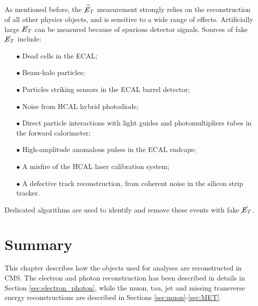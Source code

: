 As mentioned before, the $\vec{\cancel{E}}_T$ measurement \cite{met_cds} strongly relies on the reconstruction of all other physics objects, and is sensitive to a wide range of effects. Artificially large $\cancel{E}_T$ can be measured because of spurious detector signals. Sources of fake $\cancel{E}_T$ include:
\begin{itemize}
\item[$\bullet$] Dead cells in the ECAL;
\item[$\bullet$] Beam-halo particles;
\item[$\bullet$] Particles striking sensors in the ECAL barrel detector;
\item[$\bullet$] Noise from HCAL hybrid photodiode;
\item[$\bullet$] Direct particle interactions with light guides and photomultipliers tubes in the forward calorimeter;
\item[$\bullet$] High-amplitude anomalous pulses in the ECAL endcaps;
\item[$\bullet$] A misfire of the HCAL laser calibration system;
\item[$\bullet$] A defective track reconstruction, from coherent noise in the silicon strip tracker.
\end{itemize}
Dedicated algorithms are used to identify and remove these events with fake $\cancel{E}_T$.

\section{Summary}

This chapter describes how the objects used for analyses are reconstructed in CMS.
The electron and photon reconstruction has been described in details in Section \ref{sec:electron_photon}, while the muon, tau, jet and missing transverse energy reconstructions are described in Sections \ref{sec:muon}-\ref{sec:MET}.
